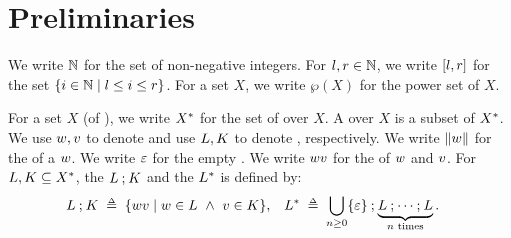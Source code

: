 
\section{Preliminaries}\label{section: preliminaries}
We write $\mathbb{N}$ for the set of non-negative integers.
For $l, r \in \mathbb{N}$, we write $[l, r]$ for the set $\{i \in \mathbb{N} \mid l \le i \le r\}$.
For a set $X$, we write
$\wp(X)$ for the power set of $X$.

For a set $X$ (of \intro*{}), we write $X^{*}$ for the set of \intro*{} over $X$.
A \intro*{} over $X$ is a subset of $X^{*}$.
We use $\word[1], \word[2]$ to denote  and use $\la[1], \la[2]$ to denote , respectively.
We write $\len{\word}$ for the \intro*{} of a  $\word$.
We write $\varepsilon$ for the empty .
We write $\word[1] \word[2]$ for the  of  $\word[1]$ and $\word[2]$.
For  $\la[1], \la[2] \subseteq X^{\kstar}$, the \intro*{} $\la[1] \compo \la[2]$ and the \intro*{} $\la[1]^{\kstar}$ is defined by:
\begin{align*}
    \la[1] \compo \la[2] & \;\defeq\; \set{\word[1] \word[2] \mid \word[1] \in \la[1] \ \land \ \word[2] \in \la[2]},                         &
    \la[1]^{\kstar}      & \;\defeq\; \bigcup_{n \ge 0} \set{\eps} \compo \underbrace{\la[1] \compo \dots \compo \la[1]}_{n \text{ times}}.
\end{align*}

